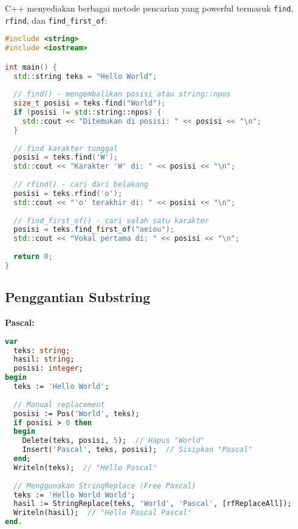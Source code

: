 \documentclass[../main.tex]{subfiles}
\begin{document}
C++ menyediakan berbagai metode pencarian yang powerful termasuk \texttt{find}, \texttt{rfind}, dan \texttt{find\_first\_of}:

\begin{lstlisting}[language=C++, caption={Pencarian di C++}]
#include <string>
#include <iostream>

int main() {
  std::string teks = "Hello World";
  
  // find() - mengembalikan posisi atau string::npos
  size_t posisi = teks.find("World");
  if (posisi != std::string::npos) {
    std::cout << "Ditemukan di posisi: " << posisi << "\n";
  }
  
  // find karakter tunggal
  posisi = teks.find('W');
  std::cout << "Karakter 'W' di: " << posisi << "\n";
  
  // rfind() - cari dari belakang
  posisi = teks.rfind('o');
  std::cout << "'o' terakhir di: " << posisi << "\n";
  
  // find_first_of() - cari salah satu karakter
  posisi = teks.find_first_of("aeiou");
  std::cout << "Vokal pertama di: " << posisi << "\n";
  
  return 0;
}
\end{lstlisting}

\subsection{Penggantian Substring}

\textbf{Pascal:}
\begin{lstlisting}[language=Pascal, caption={Replace di Pascal}]
var
  teks: string;
  hasil: string;
  posisi: integer;
begin
  teks := 'Hello World';
  
  // Manual replacement
  posisi := Pos('World', teks);
  if posisi > 0 then
  begin
    Delete(teks, posisi, 5);  // Hapus "World"
    Insert('Pascal', teks, posisi);  // Sisipkan "Pascal"
  end;
  Writeln(teks);  // "Hello Pascal"
  
  // Menggunakan StringReplace (Free Pascal)
  teks := 'Hello World World';
  hasil := StringReplace(teks, 'World', 'Pascal', [rfReplaceAll]);
  Writeln(hasil);  // "Hello Pascal Pascal"
end.
\end{lstlisting}
\end{document}
